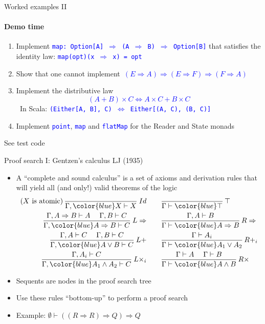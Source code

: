 \documentclass[english]{beamer}
\begin{document}
\begin{frame}{Worked examples II}


\framesubtitle{Demo time}
\begin{enumerate}
\item Implement \texttt{\textcolor{blue}{\footnotesize{}map:\ Option{[}A{]}
$\Rightarrow$ (A $\Rightarrow$ B) $\Rightarrow$ Option{[}B{]}}}
that satisfies the identity law: \texttt{\textcolor{blue}{\footnotesize{}map(opt)(x
$\Rightarrow$ x) = opt}}{\footnotesize \par}
\item Show that one cannot implement\texttt{\textcolor{blue}{\footnotesize{}
$\left(E\Rightarrow A\right)\Rightarrow\left(E\Rightarrow F\right)\Rightarrow\left(F\Rightarrow A\right)$}}{\footnotesize \par}
\item Implement the distributive law\texttt{\textcolor{blue}{\footnotesize{}
\[
\left(A+B\right)\times C\Leftrightarrow A\times C+B\times C
\]
}}In Scala: \texttt{\textcolor{blue}{\footnotesize{}(Either{[}A, B{]},
C) $\Leftrightarrow$ Either{[}(A, C), (B, C){]}}}{\footnotesize \par}
\item Implement \texttt{\textcolor{blue}{\footnotesize{}point}}, \texttt{\textcolor{blue}{\footnotesize{}map}}
and \texttt{\textcolor{blue}{\footnotesize{}flatMap}} for the Reader
and State monads
\end{enumerate}
See test code
\end{frame}

\begin{frame}{Proof search I: Gentzen's calculus LJ (1935)}

\begin{itemize}
\item A ``complete and sound calculus'' is a set of axioms and derivation
rules that will yield all (and only!) valid theorems of the logic
\begin{align*}
\text{(}X\text{ is atomic)\,}\frac{}{\Gamma,{\color{blue}X}\vdash X}\:Id & \qquad\frac{}{\Gamma\vdash{\color{blue}\top}}\,\top\\
\frac{\Gamma,A\Rightarrow B\vdash A\quad\;\Gamma,B\vdash C}{\Gamma,{\color{blue}A\Rightarrow B}\vdash C}\:L\Rightarrow & \qquad\frac{\Gamma,A\vdash B}{\Gamma\vdash{\color{blue}A\Rightarrow B}}\,R\Rightarrow\\
\frac{\Gamma,A\vdash C\quad\;\Gamma,B\vdash C}{\Gamma,{\color{blue}A\vee B}\vdash C}\:L+ & \qquad\frac{\Gamma\vdash A_{i}}{\Gamma\vdash{\color{blue}A_{1}\vee A_{2}}}\,R+_{i}\\
\frac{\Gamma,A_{i}\vdash C}{\Gamma,{\color{blue}A_{1}\wedge A_{2}}\vdash C}\:L\times_{i} & \qquad\frac{\Gamma\vdash A\quad\;\Gamma\vdash B}{\Gamma\vdash{\color{blue}A\wedge B}}\,R\times
\end{align*}
\item Sequents are nodes in the proof search tree
\item Use these rules ``bottom-up'' to perform a proof search
\item Example: $\emptyset\vdash\left(\left(R\Rightarrow R\right)\Rightarrow Q\right)\Rightarrow Q$
\end{itemize}
\end{frame}
\end{document}
